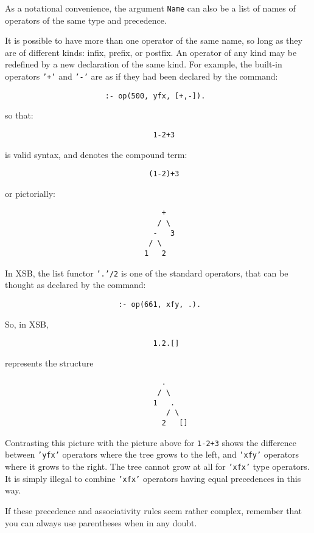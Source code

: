 As a notational convenience, the argument {\tt Name} can also be a list of
names of operators of the same type and precedence.

It is possible to have more than one operator of the same name, so
long as they are of different kinds: infix, prefix, or postfix.  An
operator of any kind may be redefined by a new declaration of the same
kind.  For example, the built-in operators {\tt '+'} and {\tt '-'} are
as if they had been declared by the command:
\begin{verbatim}
                       :- op(500, yfx, [+,-]).
\end{verbatim}
so that:
\begin{verbatim}
                                  1-2+3
\end{verbatim}
is valid syntax, and denotes the compound term:
\begin{verbatim}
                                 (1-2)+3
\end{verbatim}
or pictorially:
\begin{verbatim}
                                    +
                                   / \
                                  -   3
                                 / \
                                1   2
\end{verbatim}

In XSB, the list functor {\tt '.'/2} is one of the standard operators,
that can be thought as declared by the command:
\begin{verbatim}
                          :- op(661, xfy, .).
\end{verbatim}
So, in XSB,
\begin{verbatim}
                                  1.2.[]
\end{verbatim}
represents the structure
\begin{verbatim}
                                    .
                                   / \
                                  1   .
                                     / \
                                    2   []
\end{verbatim}
Contrasting this picture with the picture above for {\tt 1-2+3} shows
the difference between {\tt 'yfx'} operators where the tree grows to
the left, and {\tt 'xfy'} operators where it grows to the right.  The
tree cannot grow at all for {\tt 'xfx'} type operators.  It is simply
illegal to combine {\tt 'xfx'} operators having equal precedences in
this way.

If these precedence and associativity rules seem rather complex, remember
that you can always use parentheses when in any doubt.

